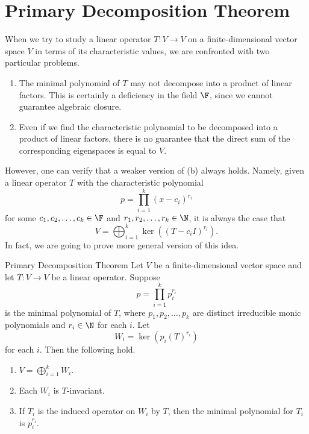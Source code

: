 \documentclass[linearalgebra]{subfiles}
\begin{document}
    \section{Primary Decomposition Theorem}
    
    \begin{remark}
        When we try to study a linear operator $T:V\to V$ on a finite-dimensional vector space $V$ in terms of its characteristic values, we are confronted with two particular problems.
        \begin{enumerate}
            \item The minimal polynomial of $T$ may not decompose into a product of linear factors. This is certainly a deficiency in the field $\F$, since we cannot guarantee algebraic closure. 
            \item Even if we find the characteristic polynomial to be decomposed into a product of linear factors, there is no guarantee that the direct sum of the corresponding eigenspaces is equal to $V$.
        \end{enumerate}
        However, one can verify that a weaker version of (b) always holds. Namely, given a linear operator $T$ with the characteristic polynomial
        \begin{equation*}
            p = \prod^{k}_{i=1} (x-c_i)^{r_i}
        \end{equation*}
        for some $c_1,c_2,\ldots,c_k\in\F$ and $r_1,r_2,\ldots,r_k\in\N$, it is always the case that
        \begin{equation*}
            V = \bigoplus^{k}_{i=1} \ker\left( \left( T-c_iI \right)^{r_i} \right).
        \end{equation*}
        In fact, we are going to prove more general version of this idea.
    \end{remark}

    \clearpage
    \begin{theorem}{Primary Decomposition Theorem}
        Let $V$ be a finite-dimensional vector space and let $T:V\to V$ be a linear operator. Suppose
        \begin{equation*}
            p = \prod^{k}_{i=1} p_i^{r_i}
        \end{equation*}
        is the minimal polynomial of $T$, where $p_1, p_2, \ldots, p_k$ are distinct irreducible monic polynomials and $r_i\in \N$ for each $i$. Let
        \begin{equation*}
            W_i = \ker\left( p_i(T)^{r_i} \right) 
        \end{equation*}
        for each $i$. Then the following hold.
        \begin{enumerate}
            \item $V = \bigoplus^{k}_{i=1} W_i$.
            \item Each $W_i$ is $T$-invariant.
            \item If $T_i$ is the induced operator on $W_i$ by $T$, then the minimal polynomial for $T_i$ is $p_i^{r_i}$.
        \end{enumerate}
    \end{theorem}
\end{document}
